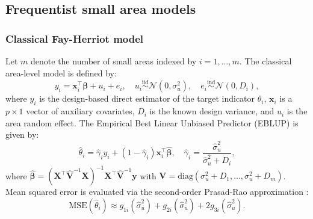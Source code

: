 \documentclass[article]{jss}
\begin{document}
\subsection{Frequentist small area models} \label{sec:methods_freq}

\subsubsection{Classical Fay-Herriot model}
Let $m$ denote the number of small areas indexed by $i = 1, \dots, m$. The classical area-level model \citep{fay1979estimates} is defined by:
%
\begin{equation} \label{eq:fh_model}
y_i = \bm{x}_i^\top \bm{\beta} + u_i + e_i, \quad u_i \overset{\mathrm{iid}}{\sim} \mathcal{N}(0, \sigma_u^2), \quad e_i \overset{\mathrm{ind}}{\sim} \mathcal{N}(0, D_i),
\end{equation}
%
where $y_i$ is the design-based direct estimator of the target indicator $\theta_i$, $\bm{x}_i$ is a $p \times 1$ vector of auxiliary covariates, $D_i$ is the known design variance, and $u_i$ is the area random effect. The Empirical Best Linear Unbiased Predictor (EBLUP) is given by:
%
\begin{equation} \label{eq:fh_eblup}
\hat{\theta}_i = \hat{\gamma}_i y_i + (1 - \hat{\gamma}_i) \bm{x}_i^\top \hat{\bm{\beta}}, \quad \hat{\gamma}_i = \frac{\hat{\sigma}_u^2}{\hat{\sigma}_u^2 + D_i},
\end{equation}
%
where $\hat{\bm{\beta}} = (\bm{X}^\top \hat{\bm{V}}^{-1} \bm{X})^{-1} \bm{X}^\top \hat{\bm{V}}^{-1} \bm{y}$ with $\bm{V} = \mathrm{diag}(\sigma_u^2 + D_1, \dots, \sigma_u^2 + D_m)$. Mean squared error is evaluated via the second-order Prasad-Rao approximation \citep{prasad1990estimation}:
%
\begin{equation} \label{eq:fh_mse}
\mathrm{MSE}(\hat{\theta}_i) \approx g_{1i}(\hat{\sigma}_u^2) + g_{2i}(\hat{\sigma}_u^2) + 2 g_{3i}(\hat{\sigma}_u^2).
\end{equation}
\end{document}
